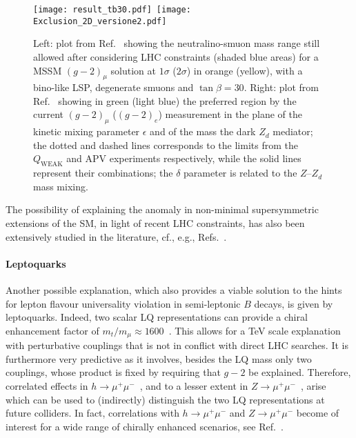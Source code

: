 \documentclass[10pt]{article}
\begin{document}
\begin{figure}[t]
  \texttt{[image: result\_tb30.pdf]}~\texttt{[image: Exclusion\_2D\_versione2.pdf]}
  \caption{Left: plot from Ref.~\cite{Endo:2021zal} showing the neutralino-smuon mass range still allowed after considering LHC constraints (shaded blue areas) for a MSSM $(g-2)_{\mu}$ solution at $1\sigma$ ($2\sigma$) in orange (yellow), with a bino-like LSP, degenerate smuons and $\tan\beta=30$. Right: plot from Ref.~\cite{Cadeddu:2021dqx} showing in green (light blue) the preferred region by the current $(g-2)_{\mu}$ ($(g-2)_{e}$) measurement in the plane of the kinetic mixing parameter $\epsilon$ and of the mass the dark $Z_d$ mediator; the dotted and dashed lines corresponds to the limits from the $Q_{\mathrm{WEAK}}$ and APV experiments respectively, while the solid lines represent their combinations; the $\delta$ parameter is related to the $Z$--$Z_d$ mass mixing.}
  \label{fig:gm2plot}
\end{figure}

The possibility of explaining the anomaly in non-minimal supersymmetric extensions of the SM, in light of recent LHC constraints, has also been extensively studied
in the literature, cf., e.g., Refs.~\cite{Kim:2001se, Shimizu:2015ara,Frank:2017ohg,Ning:2017dng,Li:2017fbg,Choudhury:2017fuu,Wang:2018vxp,Yang:2018guw,Kotlarski:2019muo,Dong:2019iaf,Yang:2020bmh,Cao:2019evo,Han:2020exx,Zhang:2021gun,Abdughani:2021pdc,Yang:2021duj,Aboubrahim:2021rwz,Heinemeyer:2021zpc,Altmannshofer:2021hfu}.



\paragraph{Leptoquarks}
%
Another possible explanation, which also provides a viable solution to the hints for lepton flavour universality violation in semi-leptonic $B$ decays, is given by leptoquarks.
Indeed, two scalar LQ representations can provide a chiral enhancement factor of {$m_t/m_\mu \approx 1600$}~\cite{Djouadi:1989md,
Chakraverty:2001yg,Cheung:2001ip,Bauer:2015knc,ColuccioLeskow:2016dox,Crivellin:2020tsz}. This allows for a TeV scale explanation with perturbative couplings that is not in conflict with direct LHC searches. It is furthermore very predictive as it involves, besides the LQ mass only two couplings, whose product is fixed by requiring that $g-2$ be explained. Therefore, correlated effects in $h\to\mu^+\mu^-$~\cite{Crivellin:2020tsz}, and to a lesser extent in $Z\to\mu^+\mu^-$~\cite{ColuccioLeskow:2016dox,Crivellin:2020mjs}, arise which can be used to (indirectly) distinguish the two LQ representations at future colliders. In fact, correlations with $h\to \mu^+\mu^-$ and $Z\to\mu^+\mu^-$ become of interest for a wide range of chirally enhanced scenarios, see Ref.~\cite{Crivellin:2021rbq}.
\end{document}
